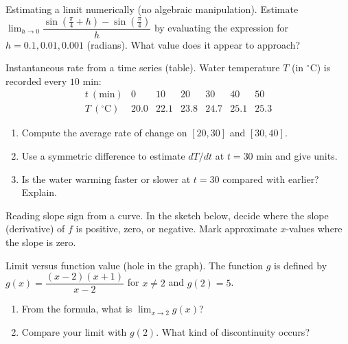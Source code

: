 \documentclass[11pt]{article}
\def\textbf#1{#1}%
\newcounter{question}
\begin{document}
\begin{question}
\textbf{Estimating a limit numerically (no algebraic manipulation).}
Estimate $\displaystyle\lim_{h\to 0}\dfrac{\sin(\tfrac{\pi}{4}+h)-\sin(\tfrac{\pi}{4})}{h}$ by evaluating the expression for $h=0.1,0.01,0.001$ (radians). What value does it appear to approach?
\end{question}

\begin{question}
\textbf{Instantaneous rate from a time series (table).}
Water temperature $T$ (in $^\circ$C) is recorded every $10$ min:
\[
\begin{array}{c|cccccc}
t\ (\text{min}) & 0 & 10 & 20 & 30 & 40 & 50\\\hline
T\ (^\circ\text{C}) & 20.0 & 22.1 & 23.8 & 24.7 & 25.1 & 25.3
\end{array}
\]
\begin{enumerate}
  \item Compute the average rate of change on $[20,30]$ and $[30,40]$.
  \item Use a symmetric difference to estimate $dT/dt$ at $t=30$ min and give units.
  \item Is the water warming faster or slower at $t=30$ compared with earlier? Explain.
\end{enumerate}
\end{question}

\begin{question}
\textbf{Reading slope sign from a curve.}
In the sketch below, decide where the slope (derivative) of $f$ is positive, zero, or negative. Mark approximate $x$-values where the slope is zero.

\begin{center}
\end{center}
\end{question}

\begin{question}
\textbf{Limit versus function value (hole in the graph).}
The function $g$ is defined by $g(x)=\dfrac{(x-2)(x+1)}{x-2}$ for $x\ne2$ and $g(2)=5$.
\begin{enumerate}
  \item From the formula, what is $\displaystyle\lim_{x\to 2} g(x)$?
  \item Compare your limit with $g(2)$. What kind of discontinuity occurs?
\end{enumerate}
\end{question}
\end{document}
